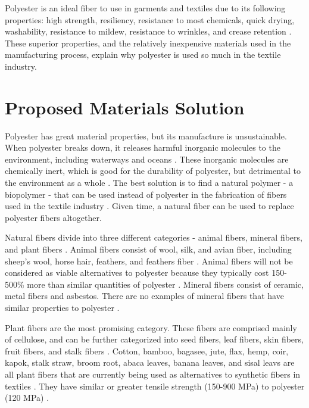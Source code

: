 \documentclass{article}
\begin{document}
Polyester is an ideal fiber to use in garments and textiles due to its following properties: high strength, resiliency, resistance to most chemicals, quick drying, washability, resistance to mildew, resistance to wrinkles, and crease retention \autocite{craftechindustries}. These superior properties, and the relatively inexpensive materials used in the manufacturing process, explain why polyester is used so much in the textile industry.

\section{Proposed Materials Solution}

Polyester has great material properties, but its manufacture is unsustainable. When polyester breaks down, it releases harmful inorganic molecules to the environment, including waterways and oceans \autocite{wastewaterbangladesh}. These inorganic molecules are chemically inert, which is good for the durability of polyester, but detrimental to the environment as a whole \autocite{polyesterstrength}\autocite{gesamp}. The best solution is to find a natural polymer - a biopolymer - that can be used instead of polyester in the fabrication of fibers used in the textile industry \autocite{gesamp}. Given time, a natural fiber can be used to replace polyester fibers altogether.

Natural fibers divide into three different categories - animal fibers, mineral fibers, and plant fibers \autocite{naturalfiberreview}. Animal fibers consist of wool, silk, and avian fiber, including sheep's wool, horse hair, feathers, and feathers fiber \autocite{naturalfiberreview}. Animal fibers will not be considered as viable alternatives to polyester because they typically cost 150-500\% more than similar quantities of polyester \autocite{naturalfiberreview}. Mineral fibers consist of ceramic, metal fibers and asbestos. There are no examples of mineral fibers that have similar properties to polyester \autocite{naturalfiberreview}. 

Plant fibers are the most promising category. These fibers are comprised mainly of cellulose, and can be further categorized into seed fibers, leaf fibers, skin fibers, fruit fibers, and stalk fibers \autocite{naturalfiberprogressreport}. Cotton, bamboo, bagasee, jute, flax, hemp, coir, kapok, stalk straw, broom root, abaca leaves, banana leaves, and sisal leavs are all plant fibers that are currently being used as alternatives to synthetic fibers in textiles \autocite{naturalfiberprogressreport}. They have similar or greater tensile strength (150-900 MPa) to polyester (120 MPa) \autocite{polyesterstrength}\autocite{naturalfiberreview}.
\end{document}
